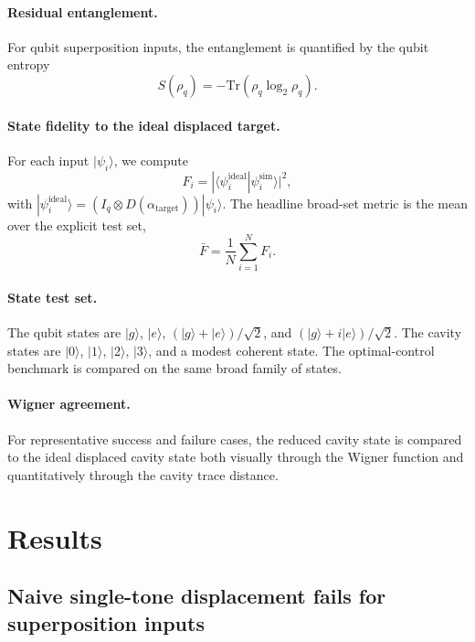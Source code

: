\documentclass[aps,pra,twocolumn,reprint,floatfix,amsmath,amssymb]{revtex4-2}
\begin{document}
\paragraph*{Residual entanglement.}
For qubit superposition inputs, the entanglement is quantified by the qubit entropy
\begin{equation}
S(\rho_q) = - \mathrm{Tr}(\rho_q \log_2 \rho_q).
\end{equation}

\paragraph*{State fidelity to the ideal displaced target.}
For each input \(|\psi_i\rangle\), we compute
\begin{equation}
F_i = |\langle \psi_i^{\mathrm{ideal}} | \psi_i^{\mathrm{sim}} \rangle|^2,
\end{equation}
with \(|\psi_i^{\mathrm{ideal}}\rangle = (I_q \otimes D(\alpha_{\mathrm{target}})) |\psi_i\rangle\).
The headline broad-set metric is the mean over the explicit test set,
\begin{equation}
\bar{F} = \frac{1}{N}\sum_{i=1}^N F_i.
\end{equation}

\paragraph*{State test set.}
The qubit states are \(|g\rangle\), \(|e\rangle\), \((|g\rangle+|e\rangle)/\sqrt{2}\), and \((|g\rangle+i|e\rangle)/\sqrt{2}\). The cavity states are \(|0\rangle\), \(|1\rangle\), \(|2\rangle\), \(|3\rangle\), and a modest coherent state. The optimal-control benchmark is compared on the same broad family of states.

\paragraph*{Wigner agreement.}
For representative success and failure cases, the reduced cavity state is compared to the ideal displaced cavity state both visually through the Wigner function and quantitatively through the cavity trace distance.

\section{Results}
\label{sec:results}

\subsection{Naive single-tone displacement fails for superposition inputs}
\end{document}
